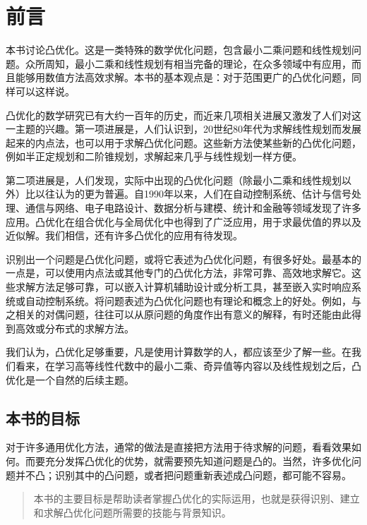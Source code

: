 \chapter*{前言}
本书讨论凸优化。这是一类特殊的数学优化问题，包含最小二乘问题和线性规划问题。众所周知，最小二乘和线性规划有相当完备的理论，在众多领域中有应用，而且能够用数值方法高效求解。本书的基本观点是：对于范围更广的凸优化问题，同样可以这样说。

凸优化的数学研究已有大约一百年的历史，而近来几项相关进展又激发了人们对这一主题的兴趣。第一项进展是，人们认识到，20世纪80年代为求解线性规划而发展起来的内点法，也可以用于求解凸优化问题。这些新方法使某些新的凸优化问题，例如半正定规划和二阶锥规划，求解起来几乎与线性规划一样方便。

第二项进展是，人们发现，实际中出现的凸优化问题（除最小二乘和线性规划以外）比以往认为的更为普遍。自1990年以来，人们在自动控制系统、估计与信号处理、通信与网络、电子电路设计、数据分析与建模、统计和金融等领域发现了许多应用。凸优化在组合优化与全局优化中也得到了广泛应用，用于求最优值的界以及近似解。我们相信，还有许多凸优化的应用有待发现。

识别出一个问题是凸优化问题，或将它表述为凸优化问题，有很多好处。最基本的一点是，可以使用内点法或其他专门的凸优化方法，非常可靠、高效地求解它。这些求解方法足够可靠，可以嵌入计算机辅助设计或分析工具，甚至嵌入实时响应系统或自动控制系统。将问题表述为凸优化问题也有理论和概念上的好处。例如，与之相关的对偶问题，往往可以从原问题的角度作出有意义的解释，有时还能由此得到高效或分布式的求解方法。

我们认为，凸优化足够重要，凡是使用计算数学的人，都应该至少了解一些。在我们看来，在学习高等线性代数中的最小二乘、奇异值等内容以及线性规划之后，凸优化是一个自然的后续主题。

\section*{本书的目标}
对于许多通用优化方法，通常的做法是直接把方法用于待求解的问题，看看效果如何。而要充分发挥凸优化的优势，就需要预先知道问题是凸的。当然，许多优化问题并不凸；识别其中的凸问题，或者把问题重新表述成凸问题，都可能不容易。

\begin{quote}
本书的主要目标是帮助读者掌握凸优化的实际运用，也就是获得识别、建立和求解凸优化问题所需要的技能与背景知识。
\end{quote}

